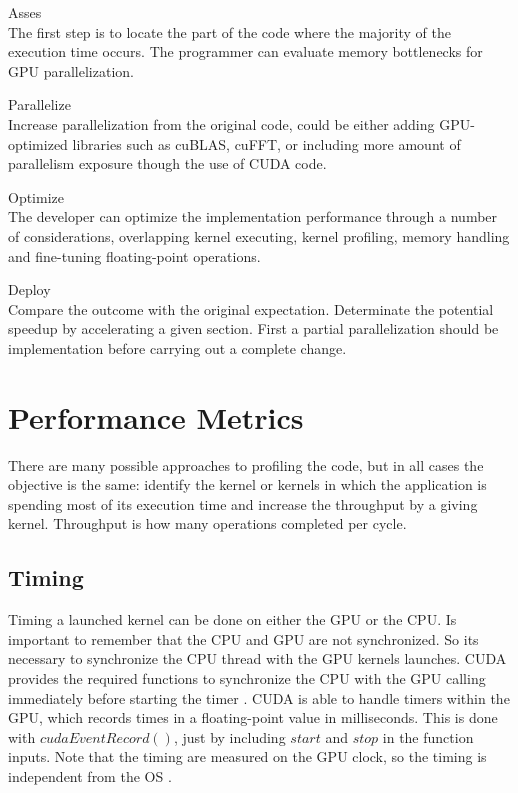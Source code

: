 \begin{description}

 \item{Asses} \hfill \\
 The first step is to locate the part of the code where the majority of the execution time occurs. The programmer can evaluate memory bottlenecks for GPU parallelization.
 \item{Parallelize} \hfill \\
 Increase parallelization from the original code, could be either adding GPU-optimized libraries such as cuBLAS, cuFFT, or including more amount of parallelism exposure though the use of CUDA code.
 \item{Optimize} \hfill \\
The developer can optimize the implementation performance through a number of considerations, overlapping kernel executing, kernel profiling, memory handling and fine-tuning floating-point operations.
 \item{Deploy} \hfill \\
 Compare the outcome with the original expectation. Determinate the potential speedup by accelerating a given section. First a partial parallelization should be implementation before carrying out a complete change.
 \end{description}

\section{Performance Metrics}

There are many possible approaches to profiling the code, but in all cases the objective is the same:  identify the kernel or kernels in which the application is spending most of its execution time and increase the throughput by a giving kernel. Throughput is how many operations completed per cycle.

\subsection{Timing}

Timing a launched kernel can be done on either the GPU or the CPU. Is important to remember that the CPU and GPU are not synchronized. So its necessary to synchronize the CPU thread with the GPU kernels launches. CUDA provides the required  functions to synchronize the CPU with the GPU calling immediately before starting the timer \cite{practices}. CUDA is able to handle timers within the GPU, which records times in a floating-point value in milliseconds. This is done with $cudaEventRecord()$, just by including $start$ and $stop$ in the function inputs. Note that the timing are measured on the GPU clock, so the timing is independent from the OS \cite{cook}.

